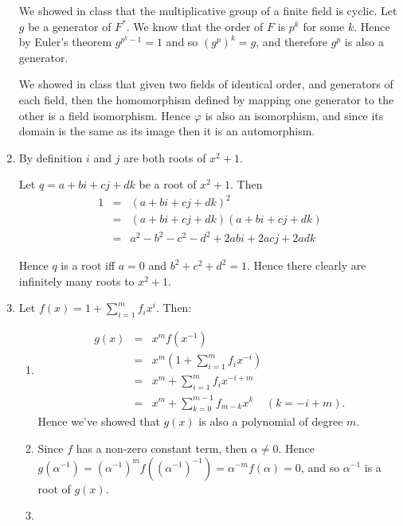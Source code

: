 \documentclass[11pt]{article} \usepackage{amssymb}
\renewcommand{\phi}{\varphi}
\begin{document}
\begin{enumerate}
  We showed in class that the multiplicative group of a 
  finite field is cyclic. Let $g$ be a generator of $F^*$.
  We know that the order of $F$ is $p^k$ for some $k$. 
  Hence by Euler's theorem $g^{p^k-1}=1$ and so $\left(g^p\right)^k=g$, and 
  therefore $g^p$ is also a generator. 

  We showed in class that given two fields of identical order, and generators
  of each field, then the homomorphism defined by mapping one generator to the
  other is a field isomorphism. Hence $\phi$ is also an isomorphism, and since
  its domain is the same as its image then it is an automorphism.

\item

  By definition $i$ and $j$ are both roots of $x^2+1$. 

  Let $q=a+bi+cj+dk$ be a root of $x^2+1$. Then
  \begin{eqnarray*}
    1 &=&(a+bi+cj+dk)^2
    \\ &=&(a+bi+cj+dk)(a+bi+cj+dk)
    \\ &=&a^2-b^2-c^2-d^2+2abi+2acj+2adk
  \end{eqnarray*}

  Hence $q$ is a root iff $a=0$ and $b^2+c^2+d^2=1$. Hence there clearly are
  infinitely many roots to $x^2+1$.

\item
  Let $f(x)=1+\sum_{i=1}^mf_ix^i$. Then:
  \begin{enumerate}
  \item 
    \begin{eqnarray*}
      g(x)&=&x^mf(x^{-1})
      \\ &=& x^m\left(1+\sum_{i=1}^mf_ix^{-i}\right)
      \\ &=& x^m+\sum_{i=1}^mf_ix^{-i+m}
      \\ &=& x^m+\sum_{k=0}^{m-1}f_{m-k}x^k \;\;\;\; (k=-i+m).
    \end{eqnarray*}
    Hence we've showed that $g(x)$ is also a polynomial of degree $m$.

  \item
    Since $f$ has a non-zero constant term, then $\alpha\neq 0$. Hence
    $g(\alpha^{-1})=(\alpha^{-1})^mf((\alpha^{-1})^{-1})=\alpha^{-m}f(\alpha)=0$, and so
    $\alpha^{-1}$ is a root of $g(x)$.

  \item


\end{enumerate}
\end{enumerate}
\end{document}
